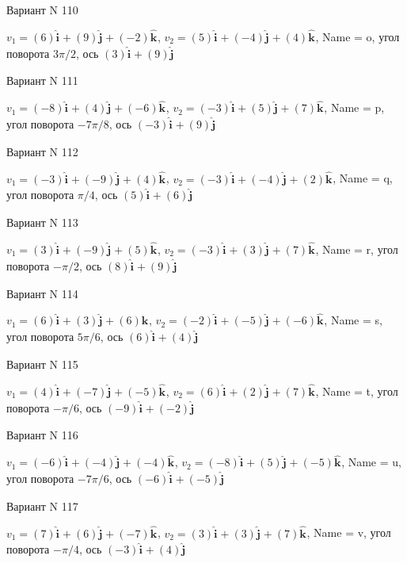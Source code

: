 \documentclass[11pt]{report}
\begin{document}
Вариант N 110

$v_1 = (6)\mathbf{\hat{i}_{}} + (9)\mathbf{\hat{j}_{}} + (-2)\mathbf{\hat{k}_{}}$, $v_2 = (5)\mathbf{\hat{i}_{}} + (-4)\mathbf{\hat{j}_{}} + (4)\mathbf{\hat{k}_{}}$, Name = o, угол поворота $3 \pi / 2$, ось $(3)\mathbf{\hat{i}_{}} + (9)\mathbf{\hat{j}_{}}$

Вариант N 111

$v_1 = (-8)\mathbf{\hat{i}_{}} + (4)\mathbf{\hat{j}_{}} + (-6)\mathbf{\hat{k}_{}}$, $v_2 = (-3)\mathbf{\hat{i}_{}} + (5)\mathbf{\hat{j}_{}} + (7)\mathbf{\hat{k}_{}}$, Name = p, угол поворота $- 7 \pi / 8$, ось $(-3)\mathbf{\hat{i}_{}} + (9)\mathbf{\hat{j}_{}}$

Вариант N 112

$v_1 = (-3)\mathbf{\hat{i}_{}} + (-9)\mathbf{\hat{j}_{}} + (4)\mathbf{\hat{k}_{}}$, $v_2 = (-3)\mathbf{\hat{i}_{}} + (-4)\mathbf{\hat{j}_{}} + (2)\mathbf{\hat{k}_{}}$, Name = q, угол поворота $\pi / 4$, ось $(5)\mathbf{\hat{i}_{}} + (6)\mathbf{\hat{j}_{}}$

Вариант N 113

$v_1 = (3)\mathbf{\hat{i}_{}} + (-9)\mathbf{\hat{j}_{}} + (5)\mathbf{\hat{k}_{}}$, $v_2 = (-3)\mathbf{\hat{i}_{}} + (3)\mathbf{\hat{j}_{}} + (7)\mathbf{\hat{k}_{}}$, Name = r, угол поворота $- \pi / 2$, ось $(8)\mathbf{\hat{i}_{}} + (9)\mathbf{\hat{j}_{}}$

Вариант N 114

$v_1 = (6)\mathbf{\hat{i}_{}} + (3)\mathbf{\hat{j}_{}} + (6)\mathbf{\hat{k}_{}}$, $v_2 = (-2)\mathbf{\hat{i}_{}} + (-5)\mathbf{\hat{j}_{}} + (-6)\mathbf{\hat{k}_{}}$, Name = s, угол поворота $5 \pi / 6$, ось $(6)\mathbf{\hat{i}_{}} + (4)\mathbf{\hat{j}_{}}$

Вариант N 115

$v_1 = (4)\mathbf{\hat{i}_{}} + (-7)\mathbf{\hat{j}_{}} + (-5)\mathbf{\hat{k}_{}}$, $v_2 = (6)\mathbf{\hat{i}_{}} + (2)\mathbf{\hat{j}_{}} + (7)\mathbf{\hat{k}_{}}$, Name = t, угол поворота $- \pi / 6$, ось $(-9)\mathbf{\hat{i}_{}} + (-2)\mathbf{\hat{j}_{}}$

Вариант N 116

$v_1 = (-6)\mathbf{\hat{i}_{}} + (-4)\mathbf{\hat{j}_{}} + (-4)\mathbf{\hat{k}_{}}$, $v_2 = (-8)\mathbf{\hat{i}_{}} + (5)\mathbf{\hat{j}_{}} + (-5)\mathbf{\hat{k}_{}}$, Name = u, угол поворота $- 7 \pi / 6$, ось $(-6)\mathbf{\hat{i}_{}} + (-5)\mathbf{\hat{j}_{}}$

Вариант N 117

$v_1 = (7)\mathbf{\hat{i}_{}} + (6)\mathbf{\hat{j}_{}} + (-7)\mathbf{\hat{k}_{}}$, $v_2 = (3)\mathbf{\hat{i}_{}} + (3)\mathbf{\hat{j}_{}} + (7)\mathbf{\hat{k}_{}}$, Name = v, угол поворота $- \pi / 4$, ось $(-3)\mathbf{\hat{i}_{}} + (4)\mathbf{\hat{j}_{}}$
\end{document}
